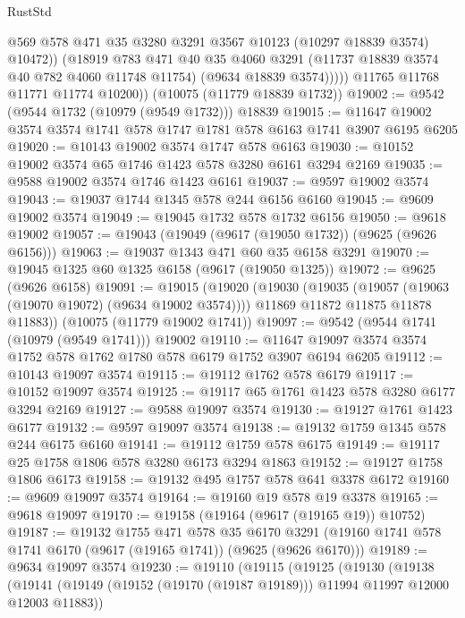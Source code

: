 \begin{lexlean}{RustStd}
\begin{coremodule}
                  @569
                  @578
                  @471
                  @35
                  @3280
                  @3291
                  @3567
                  @10123
                  (@10297 @18839 @3574)
                  @10472))
              (@18919
                @783
                @471
                @40
                @35
                @4060
                @3291
                (@11737 @18839 @3574 @40 @782 @4060 @11748 @11754)
                (@9634 @18839 @3574)))))
        @11765
        @11768
        @11771
        @11774
        @10200))
    (@10075 (@11779 @18839 @1732))
@19002 := @9542 (@9544 @1732 (@10979 (@9549 @1732))) @18839
@19015 := @11647 @19002 @3574 @3574 @1741 @578 @1747 @1781 @578 @6163 @1741 @3907 @6195 @6205
@19020 := @10143 @19002 @3574 @1747 @578 @6163
@19030 := @10152 @19002 @3574 @65 @1746 @1423 @578 @3280 @6161 @3294 @2169
@19035 := @9588 @19002 @3574 @1746 @1423 @6161
@19037 := @9597 @19002 @3574
@19043 := @19037 @1744 @1345 @578 @244 @6156 @6160
@19045 := @9609 @19002 @3574
@19049 := @19045 @1732 @578 @1732 @6156
@19050 := @9618 @19002
@19057 := @19043 (@19049 (@9617 (@19050 @1732)) (@9625 (@9626 @6156)))
@19063 := @19037 @1343 @471 @60 @35 @6158 @3291
@19070 := @19045 @1325 @60 @1325 @6158 (@9617 (@19050 @1325))
@19072 := @9625 (@9626 @6158)
@19091 := @19015
    (@19020
      (@19030
        (@19035 (@19057 (@19063 (@19070 @19072) (@9634 @19002 @3574))))
        @11869
        @11872
        @11875
        @11878
        @11883))
    (@10075 (@11779 @19002 @1741))
@19097 := @9542 (@9544 @1741 (@10979 (@9549 @1741))) @19002
@19110 := @11647 @19097 @3574 @3574 @1752 @578 @1762 @1780 @578 @6179 @1752 @3907 @6194 @6205
@19112 := @10143 @19097 @3574
@19115 := @19112 @1762 @578 @6179
@19117 := @10152 @19097 @3574
@19125 := @19117 @65 @1761 @1423 @578 @3280 @6177 @3294 @2169
@19127 := @9588 @19097 @3574
@19130 := @19127 @1761 @1423 @6177
@19132 := @9597 @19097 @3574
@19138 := @19132 @1759 @1345 @578 @244 @6175 @6160
@19141 := @19112 @1759 @578 @6175
@19149 := @19117 @25 @1758 @1806 @578 @3280 @6173 @3294 @1863
@19152 := @19127 @1758 @1806 @6173
@19158 := @19132 @495 @1757 @578 @641 @3378 @6172
@19160 := @9609 @19097 @3574
@19164 := @19160 @19 @578 @19 @3378
@19165 := @9618 @19097
@19170 := @19158 (@19164 (@9617 (@19165 @19)) @10752)
@19187 := @19132
    @1755
    @471
    @578
    @35
    @6170
    @3291
    (@19160 @1741 @578 @1741 @6170 (@9617 (@19165 @1741)) (@9625 (@9626 @6170)))
@19189 := @9634 @19097 @3574
@19230 := @19110
    (@19115
      (@19125
        (@19130
          (@19138
            (@19141 (@19149 (@19152 (@19170 (@19187 @19189))) @11994 @11997 @12000 @12003 @11883))

\end{coremodule}
\end{lexlean}
